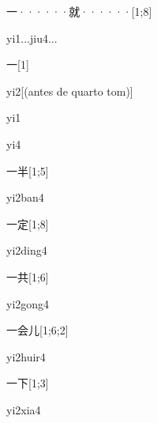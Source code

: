 \begin{verbete}[yi1...jiu4...]{一······就······}[1;8]
\begin{pronuncia}{yi1...jiu4...}
\end{pronuncia}
\end{verbete}

\begin{verbete}[yi2]{一}[1]
\begin{pronuncia}[\\]{yi2}[(antes de quarto tom)]
\end{pronuncia}
\begin{pronuncia}{yi1}
\end{pronuncia}
\begin{pronuncia}{yi4}
\end{pronuncia}
\end{verbete}

\begin{verbete}[yi2ban4]{一半}[1;5]
\begin{pronuncia}{yi2ban4}
\end{pronuncia}
\end{verbete}

\begin{verbete}[yi2ding4]{一定}[1;8]
\begin{pronuncia}{yi2ding4}
\end{pronuncia}
\end{verbete}

\begin{verbete}[yi2gong4]{一共}[1;6]
\begin{pronuncia}{yi2gong4}
\end{pronuncia}
\end{verbete}

\begin{verbete}[yi2huir4]{一会儿}[1;6;2]
\begin{pronuncia}{yi2huir4}
\end{pronuncia}
\end{verbete}

\begin{verbete}[yi2xia4]{一下}[1;3]
\begin{pronuncia}{yi2xia4}
\end{pronuncia}
\end{verbete}

